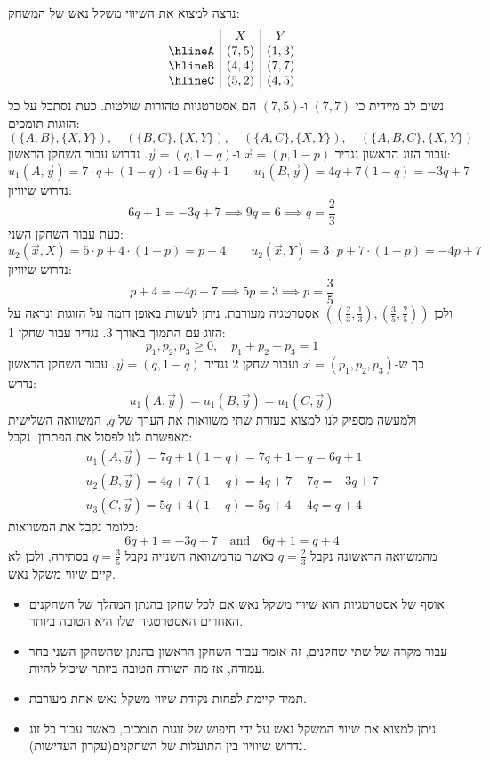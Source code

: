 \documentclass{tstextbook}
\begin{document}
\begin{example}
נרצה למצוא את השיווי משקל נאש של המשחק:
$$\begin{array}{c|c|c} & X & Y \\ \hlineA & (7,5) & (1,3) \\ \hlineB & (4,4) & (7,7) \\ \hlineC & (5,2) & (4,5) 
\end{array}$$
נשים לב מיידית כי \((7,7)\) ו-\((7,5)\) הם אסטרטגיות טהורות שולטות. כעת נסתכל על כל הזוגות תומכים:
$$\left( \{ A,B \},\{ X,Y \} \right),\quad \left( \{ B,C \},\{ X,Y \} \right),\quad \left( \{ A,C \},\{ X,Y \} \right),\quad \left( \{ A,B,C \},\{ X,Y \} \right)$$
עבור הזוג הראשון נגדיר \(\vec{x}=(p,1-p)\) ו-\(\vec{y}=(q,1-q)\). נדרוש עבור השחקן הראשון:
$$u_{1}\left( A,\vec{y} \right)=7\cdot q+(1-q)\cdot 1=6q+1\qquad u_{1}\left( B,\vec{y} \right)=4q+7(1-q)=-3q+7$$
נדרוש שיוויון:
$$6q+1=-3q+7\implies 9q=6\implies q=\frac{2}{3}$$
כעת עבור השחקן השני:
$$u_{2}\left( \vec{x},X \right)=5\cdot p+4\cdot(1-p)=p+4\qquad u_{2}\left( \vec{x},Y \right)=3\cdot p+7\cdot(1-p)=-4p+7$$
נדרוש שיוויון:
$$p+4=-4p+7\implies 5p=3\implies p=\frac{3}{5}$$
ולכן \(\left( \left( \frac{2}{3},\frac{1}{3} \right),\left( \frac{3}{5},\frac{2}{5} \right) \right)\) אסטרטגיה מעורבת. ניתן לעשות באופן דומה על הזוגות ונראה על הזוג עם התמוך באורך 3. נגדיר עבור שחקן 1:
$$p_{1},p_{2},p_{3}\ge0,\quad p_{1}+p_{2}+p_{3}=1$$
כך ש-\(\vec{x}=(p_{1},p_{2},p_{3})\) ועבור שחקן 2 נגדיר \(\vec{y}=(q,1-q)\). עבור השחקן הראשון נדרש:
$$u_{1}\left( A,\vec{y} \right)=u_{1}\left( B,\vec{y} \right)=u_{1}\left( C,\vec{y} \right)$$
ולמעשה מספיק לנו למצוא בעזרת שתי משוואות את הערך של \(q\), המשוואה השלישית מאפשרת לנו לפסול את הפתרון. נקבל:
\begin{gather*}u_{1}\left( A,\vec{y} \right)=7q+1(1-q)=7q+1-q=6q+1  \\u_{2}\left( B,\vec{y} \right)=4q+7(1-q)=4q+7-7q=-3q+7 \\u_{3}\left( C,\vec{y} \right)=5q+4(1-q)=5q+4-4q=q+4
\end{gather*}
כלומר נקבל את המשוואות:
$$6q+1=-3q+7\quad\mathrm{and}\quad6q+1=q+4$$
מהמשוואה הראשונה נקבל \(q=\frac{2}{3}\) כאשר מהמשוואה השנייה נקבל \(q=\frac{3}{5}\) בסתירה, ולכן לא קיים שיווי משקל נאש.

\end{example}
\begin{summary}
  \begin{itemize}
    \item אוסף של אסטרטגיות הוא שיווי משקל נאש אם לכל שחקן בהנתן המהלך של השחקנים האחרים האסטרטגיה שלו היא הטובה ביותר.
    \item עבור מקרה של שתי שחקנים, זה אומר עבור השחקן הראשון בהנתן שהשחקן השני בחר עמודה, אז מה השורה הטובה ביותר שיכול להיות.
    \item תמיד קיימת לפחות נקודת שיווי משקל נאש אחת מעורבת.
    \item ניתן למצוא את שיווי המשקל נאש על ידי חיפוש של זוגות תומכים, כאשר עבור כל זוג נדרוש שיוויון בין התועלות של השחקנים(עקרון העדישות).
  \end{itemize}
\end{summary}
\end{document}

